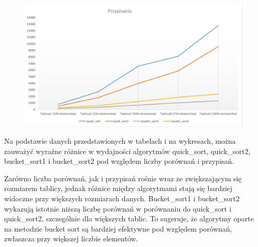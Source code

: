 \documentclass{article}
\theoremstyle{definition}
\begin{document}
		\begin{table}[H]
			\centering
			\caption{Zestawienie ilości przypisań dla quick\_sort i bucket\_sort oraz ich modyfikacji.}
		\end{table}
		\begin{figure}[H]	
			\centering
			\includegraphics[width=1.0\textwidth]{PRZY1.jpg} 
		\end{figure}
		Na podstawie danych przedstawionych w tabelach i na wykresach, można zauważyć wyraźne różnice w wydajności algorytmów quick\_sort, quick\_sort2, bucket\_sort1 i bucket\_sort2 pod względem liczby porównań i przypisań.
		
		Zarówno liczba porównań, jak i przypisań rośnie wraz ze zwiększającym się rozmiarem tablicy, jednak różnice między algorytmami stają się bardziej widoczne przy większych rozmiarach danych. Bucket\_sort1 i bucket\_sort2 wykazują istotnie niższą liczbę porównań w porównaniu do quick\_sort i quick\_sort2, szczególnie dla większych tablic. To sugeruje, że algorytmy oparte na metodzie bucket sort są bardziej efektywne pod względem porównań, zwłaszcza przy większej liczbie elementów.
		
\end{document}
